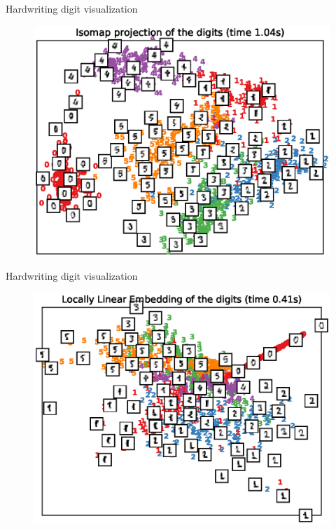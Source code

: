 \documentclass[10pt]{beamer}
\begin{document}
\begin{frame}{Hardwriting digit visualization}
\begin{figure}
\centering
\includegraphics[scale=0.65]{./image/experiment/isomap.eps}
\end{figure}
\end{frame}

\begin{frame}{Hardwriting digit visualization}
\begin{figure}
\centering
\includegraphics[scale=0.65]{./image/experiment/lle.eps}
\end{figure}
\end{frame}
\end{document}
